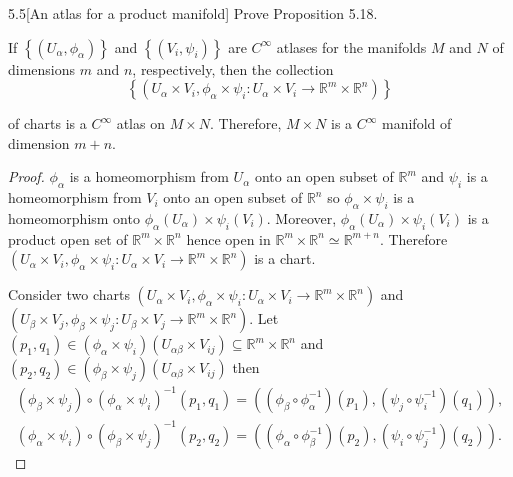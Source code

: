 \begin{problem}{5.5}[An atlas for a product manifold]\label{problem:5.5}
Prove Proposition 5.18.

If \( \left\{ (U_{\alpha}, \phi_{\alpha}) \right\} \) and \( \left\{ (V_{i}, \psi_{i}) \right\} \) are \( C^{\infty} \) atlases for the manifolds \( M \) and \( N \) of dimensions \( m \) and \( n \), respectively, then the collection
\[
    \left\{ (U_{\alpha} \times V_{i}, \phi_{\alpha} \times \psi_{i}: U_{\alpha} \times V_{i} \to \mathbb{R}^{m} \times \mathbb{R}^{n}) \right\}
\]

of charts is a \( C^{\infty} \) atlas on \( M\times N \). Therefore, \( M\times N \) is a \( C^{\infty} \) manifold of dimension \( m + n \).
\end{problem}

\begin{proof}
    \( \phi_{\alpha} \) is a homeomorphism from \( U_{\alpha} \) onto an open subset of \( \mathbb{R}^{m} \) and \( \psi_{i} \) is a homeomorphism from \( V_{i} \) onto an open subset of \( \mathbb{R}^{n} \) so \( \phi_{\alpha} \times \psi_{i} \) is a homeomorphism onto \( \phi_{\alpha}(U_{\alpha}) \times \psi_{i}(V_{i}) \). Moreover, \( \phi_{\alpha}(U_{\alpha}) \times \psi_{i}(V_{i}) \) is a product open set of \( \mathbb{R}^{m} \times \mathbb{R}^{n} \) hence open in \( \mathbb{R}^{m} \times \mathbb{R}^{n} \simeq \mathbb{R}^{m + n} \). Therefore \( (U_{\alpha} \times V_{i}, \phi_{\alpha} \times \psi_{i}: U_{\alpha} \times V_{i} \to \mathbb{R}^{m} \times \mathbb{R}^{n}) \) is a chart.

    Consider two charts \( (U_{\alpha} \times V_{i}, \phi_{\alpha} \times \psi_{i}: U_{\alpha} \times V_{i} \to \mathbb{R}^{m} \times \mathbb{R}^{n})  \) and \( (U_{\beta} \times V_{j}, \phi_{\beta} \times \psi_{j}: U_{\beta} \times V_{j} \to \mathbb{R}^{m} \times \mathbb{R}^{n}) \). Let \( (p_{1}, q_{1}) \in (\phi_{\alpha} \times \psi_{i})(U_{\alpha\beta} \times V_{ij}) \subseteq \mathbb{R}^{m} \times \mathbb{R}^{n} \) and \( (p_{2}, q_{2}) \in (\phi_{\beta} \times \psi_{j})(U_{\alpha\beta} \times V_{ij}) \) then
    \[
        \begin{split}
            {(\phi_{\beta} \times \psi_{j})} \circ {(\phi_{\alpha} \times \psi_{i})}^{-1}(p_{1}, q_{1}) = ((\phi_{\beta} \circ \phi_{\alpha}^{-1})(p_{1}), (\psi_{j} \circ \psi_{i}^{-1})(q_{1})), \\
            {(\phi_{\alpha} \times \psi_{i})} \circ {(\phi_{\beta} \times \psi_{j})}^{-1}(p_{2}, q_{2}) = ((\phi_{\alpha} \circ \phi_{\beta}^{-1})(p_{2}), (\psi_{i} \circ \psi_{j}^{-1})(q_{2})).
        \end{split}
    \]


\end{proof}
